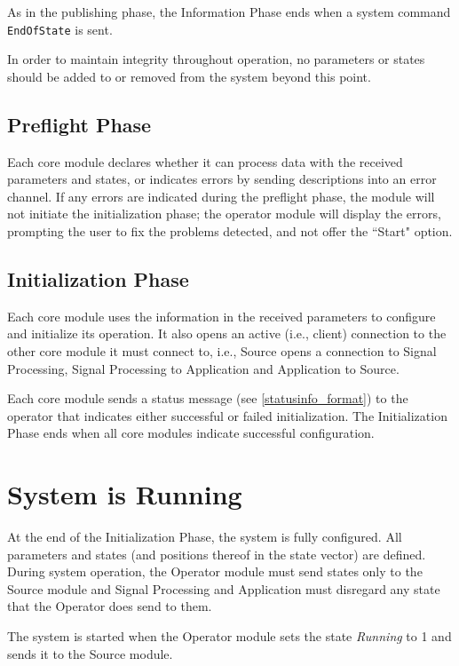 \documentclass[letterpaper,oneside,12pt]{book}
\begin{document}
As in the publishing phase, the Information Phase ends when a system command 
\texttt{EndOfState} is sent.

In order to maintain integrity throughout operation, no parameters or states 
should be added to or removed from the system beyond this point.

\subsection{Preflight Phase}

Each core module declares whether it can process data with the received
parameters and states, or indicates errors by sending descriptions into
an error channel. If any errors are indicated during the preflight phase,
the module will not initiate the initialization phase; the operator module
will display the errors, prompting the user to fix the problems detected, 
and not offer the ``Start" option.

\subsection{Initialization Phase}

Each core module uses the information in the received parameters to configure and 
initialize its operation. It also opens an active (i.e., client) connection 
to the other core module it must connect to, i.e., Source opens a 
connection to Signal Processing, Signal Processing to Application and 
Application to Source.

Each core module sends a status message (see \ref{statusinfo_format}) to the 
operator that indicates either successful or failed initialization. The 
Initialization Phase ends when all core modules indicate successful 
configuration.


\section{System is Running}
\label{system_performance}

At the end of the Initialization Phase, the system is fully configured. All 
parameters and states (and positions thereof in the state vector) are defined. 
During system operation, the Operator module must send states only to the Source 
module and Signal Processing and Application must disregard any state that the 
Operator does send to them. 

The system is started when the Operator module sets the state \textit{Running} 
to 1 and sends it to the Source module. 
\end{document}
